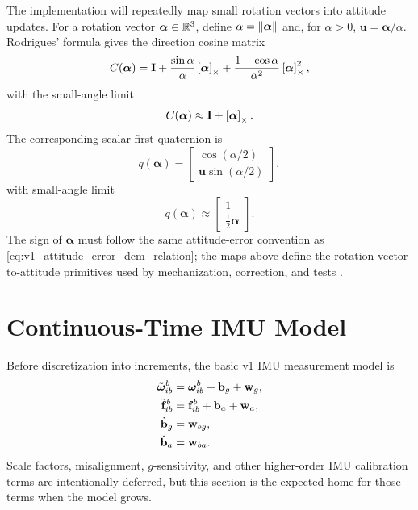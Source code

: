 The implementation will repeatedly map small rotation vectors into attitude
updates. For a rotation vector $\boldsymbol\alpha\in\mathbb{R}^3$, define
$\alpha=\left\lVert \boldsymbol\alpha \right\rVert$ and, for $\alpha>0$,
$\mathbf{u}=\boldsymbol\alpha/\alpha$. Rodrigues' formula gives the direction
cosine matrix
\begin{equation}
C(\boldsymbol\alpha)
=
\mathbf{I}
+
\frac{\sin\alpha}{\alpha}\left[\boldsymbol\alpha\right]_{\times}
+
\frac{1-\cos\alpha}{\alpha^2}
\left[\boldsymbol\alpha\right]_{\times}^2,
\label{eq:v1_rodrigues_dcm}
\end{equation}
with the small-angle limit
\begin{equation}
C(\boldsymbol\alpha)
\approx
\mathbf{I}+\left[\boldsymbol\alpha\right]_{\times}.
\end{equation}
The corresponding scalar-first quaternion is
\begin{equation}
q(\boldsymbol\alpha)
=
\begin{bmatrix}
\cos\left(\alpha/2\right)\\
\mathbf{u}\sin\left(\alpha/2\right)
\end{bmatrix},
\label{eq:v1_rotation_vector_quaternion}
\end{equation}
with small-angle limit
\begin{equation}
q(\boldsymbol\alpha)
\approx
\begin{bmatrix}
1\\
\frac{1}{2}\boldsymbol\alpha
\end{bmatrix}.
\end{equation}
The sign of $\boldsymbol\alpha$ must follow the same attitude-error convention
as \cref{eq:v1_attitude_error_dcm_relation}; the maps above define the
rotation-vector-to-attitude primitives used by mechanization, correction, and
tests \cite{groves2013,sola2018}.

\section{Continuous-Time IMU Model}

Before discretization into increments, the basic v1 IMU measurement model is
\begin{align}
\tilde{\boldsymbol{\omega}}_{ib}^{b}
&=
\boldsymbol{\omega}_{ib}^{b}
+
\mathbf{b}_g
+
\mathbf{w}_g,\\
\tilde{\mathbf{f}}_{ib}^{b}
&=
\mathbf{f}_{ib}^{b}
+
\mathbf{b}_a
+
\mathbf{w}_a,\\
\dot{\mathbf{b}}_g
&=
\mathbf{w}_{bg},\\
\dot{\mathbf{b}}_a
&=
\mathbf{w}_{ba}.
\end{align}
Scale factors, misalignment, $g$-sensitivity, and other higher-order IMU
calibration terms are intentionally deferred, but this section is the expected
home for those terms when the model grows.

